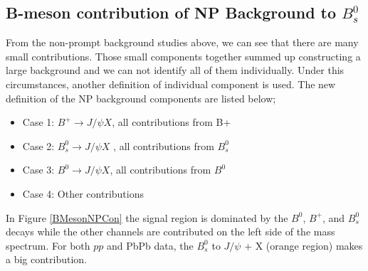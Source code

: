  
\subsection{B-meson contribution of NP Background to $B^0_s$}


From the non-prompt background studies above, we can see that there are many small contributions. Those small components together summed up constructing a large background and we can not identify all of them individually. Under this circumstances, another definition of individual component is used. The new definition of the NP background components are listed below;

\begin{itemize}
\item {Case 1: $ B^{+} \rightarrow J/\psi X $, all contributions from B+}
\item {Case 2: $ B_{s}^{0} \rightarrow J/\psi X $ , all contributions from $ B_{s}^{0} $ }
\item {Case 3: $ B^{0} \rightarrow J/\psi X$, all contributions from $ B^{0}$}
\item {Case 4: Other contributions}
\end{itemize}

In Figure \ref{BMesonNPCon} the signal region is dominated by the $B^{0}$, $B^{+}$, and $B_{s}^{0} $ decays while the other channels are contributed on the left side of the mass spectrum. For both $pp$ and PbPb data, the $B^{0}_{s} $ to $J/\psi$ + X  (orange region) makes a big contribution.

